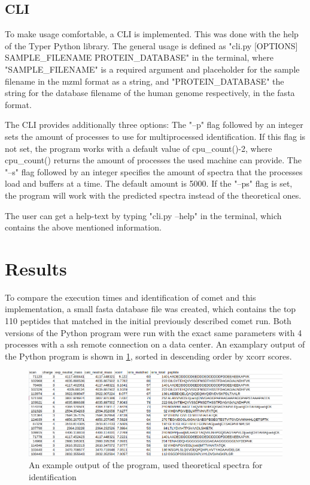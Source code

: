 \documentclass[11pt]{article}
\begin{document}
\subsection{CLI}
To make usage comfortable, a CLI is implemented. This was done with the help of the Typer Python library. The general usage is defined as "cli.py [OPTIONS] SAMPLE\_FILENAME PROTEIN\_DATABASE" in the terminal, where "SAMPLE\_FILENAME" is a required argument and placeholder for the sample filename in the mzml format as a string, and "PROTEIN\_DATABASE" the string for the database filename of the human genome respectively, in the fasta format. 

The CLI provides additionally three options: The "--p" flag followed by an integer sets the amount of processes to use for multiprocessed identification. If this flag is not set, the program works with a default value of cpu\_count()-2, where cpu\_count() returns the amount of processes the used machine can provide. The "--s" flag followed by an integer specifies the amount of spectra that the processes load and buffers at a time. The default amount is 5000. If the "--ps" flag is set, the program will work with the predicted spectra instead of the theoretical ones.

The user can get a help-text by typing "cli.py --help" in the terminal, which contains the above mentioned information.

\section{Results}
To compare the execution times and identification of comet and this implementation, a small fasta database file was created, which contains the top 110 peptides that matched in the initial previously described comet run. Both versions of the Python program were run with the exact same parameters with 4 processes with a ssh remote connection on a data center.
An examplary output of the Python program is shown in \cref{fig:output}, sorted in descending order by xcorr scores.
\begin{figure}[ht]
\centering
\includegraphics[width=1\textwidth]{figs/output.png}
\caption{An example output of the program, used theoretical spectra for identification}
\label{fig:output}
\end{figure}
\end{document}
